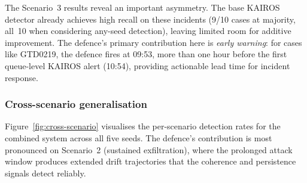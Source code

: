 \documentclass[10pt,twocolumn]{article}
\begin{document}
The Scenario~3 results reveal an important asymmetry.  The base KAIROS
detector already achieves high recall on these incidents (9/10 cases at
majority, all~10 when considering any-seed detection), leaving limited
room for additive improvement.  The defence's primary contribution here
is \emph{early warning}: for cases like GTD0219, the defence fires at
09:53, more than one hour before the first queue-level KAIROS alert
(10:54), providing actionable lead time for incident response.

\subsubsection{Cross-scenario generalisation}

Figure~\ref{fig:cross-scenario} visualises the per-scenario detection
rates for the combined system across all five seeds.  The defence's
contribution is most pronounced on Scenario~2 (sustained exfiltration),
where the prolonged attack window produces extended drift trajectories
that the coherence and persistence signals detect reliably.
\end{document}
